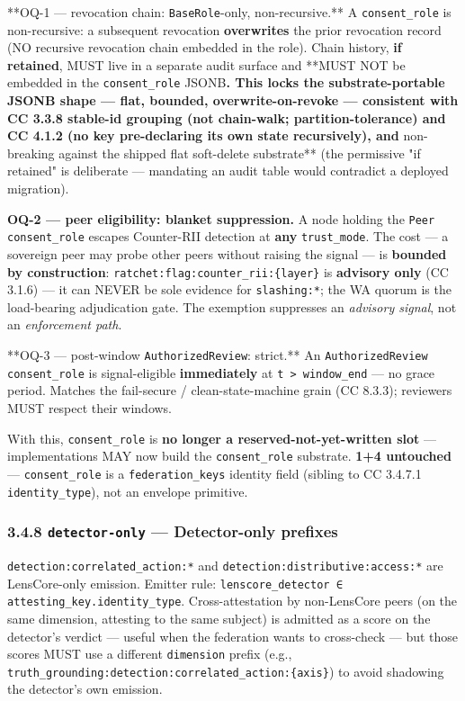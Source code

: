 \documentclass[11pt]{article}
\begin{document}
**OQ-1 — revocation chain: \texttt{BaseRole}-only, non-recursive.** A \texttt{consent\_role} is non-recursive: a subsequent revocation \textbf{overwrites} the prior revocation record (NO recursive revocation chain embedded in the role). Chain history, \textbf{if retained}, MUST live in a separate audit surface and **MUST NOT be embedded in the \texttt{consent\_role} JSONB\textbf{. This locks the substrate-portable JSONB shape — flat, bounded, overwrite-on-revoke — consistent with CC 3.3.8 stable-id grouping (not chain-walk; partition-tolerance) and CC 4.1.2 (no key pre-declaring its own state recursively), and }non-breaking against the shipped flat soft-delete substrate** (the permissive "if retained" is deliberate — mandating an audit table would contradict a deployed migration).


\textbf{OQ-2 — peer eligibility: blanket suppression.} A node holding the \texttt{Peer} \texttt{consent\_role} escapes Counter-RII detection at \textbf{any} \texttt{trust\_mode}. The cost — a sovereign peer may probe other peers without raising the signal — is \textbf{bounded by construction}: \texttt{ratchet:flag:counter\_rii:\{layer\}} is \textbf{advisory only} (CC 3.1.6) — it can NEVER be sole evidence for \texttt{slashing:*}; the WA quorum is the load-bearing adjudication gate. The exemption suppresses an \textit{advisory signal}, not an \textit{enforcement path}.


**OQ-3 — post-window \texttt{AuthorizedReview}: strict.** An \texttt{AuthorizedReview} \texttt{consent\_role} is signal-eligible \textbf{immediately} at \texttt{t > window\_end} — no grace period. Matches the fail-secure / clean-state-machine grain (CC 8.3.3); reviewers MUST respect their windows.


With this, \texttt{consent\_role} is \textbf{no longer a reserved-not-yet-written slot} — implementations MAY now build the \texttt{consent\_role} substrate. \textbf{1+4 untouched} — \texttt{consent\_role} is a \texttt{federation\_keys} identity field (sibling to CC 3.4.7.1 \texttt{identity\_type}), not an envelope primitive.


\subsubsection*{3.4.8 \texttt{detector-only} — Detector-only prefixes}


\texttt{detection:correlated\_action:*} and \texttt{detection:distributive:access:*} are LensCore-only emission. Emitter rule: \texttt{lenscore\_detector ∈ attesting\_key.identity\_type}. Cross-attestation by non-LensCore peers (on the same dimension, attesting to the same subject) is admitted as a score on the detector's verdict — useful when the federation wants to cross-check — but those scores MUST use a different \texttt{dimension} prefix (e.g., \texttt{truth\_grounding:detection:correlated\_action:\{axis\}}) to avoid shadowing the detector's own emission.
\end{document}
